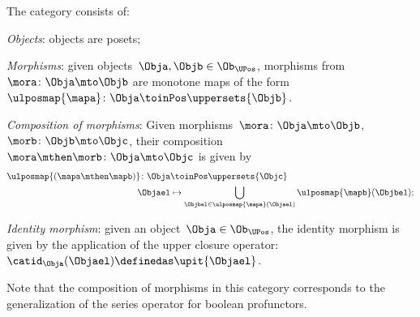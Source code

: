 \begin{definition}
\label{def:upos_cat}
The category \UPos consists of:
\begin{compactenum}
    \item \emph{Objects}: objects are posets;
    \item \emph{Morphisms}: given objects~$\Obja,\Objb\in \Ob_{\UPos}$, morphisms from~$\mora\colon \Obja \mto \Objb$ are monotone maps of the form~$\ulposmap{\mapa} \colon \Obja \toinPos \uppersets{\Objb}$.
    \item \emph{Composition of morphisms}: Given morphisms~$\mora\colon \Obja \mto \Objb$,~$\morb\colon \Objb\mto \Objc$, their composition~$\mora\mthen \morb\colon \Obja\mto \Objc$ is given by
    \begin{equation}
    \begin{aligned}
        \ulposmap{(\mapa \mthen \mapb)} \colon \Obja&\toinPos \uppersets{\Objc}\\
        \Objael&\mapsto \bigcup_{\Objbel\in \ulposmap{\mapa}(\Objael)}\ulposmap{\mapb}(\Objbel);
    \end{aligned}
    \end{equation}
    \item \emph{Identity morphism}: given an object~$\Obja\in \Ob_{\UPos}$, the identity morphism is given by the application of the upper closure operator:~$\catid_\Obja(\Objael)\definedas \upit\{\Objael\}$.
\end{compactenum}
\end{definition}

\begin{remark}
Note that the composition of morphisms in this category corresponds to the generalization of the series operator for boolean profunctors.
\end{remark}

